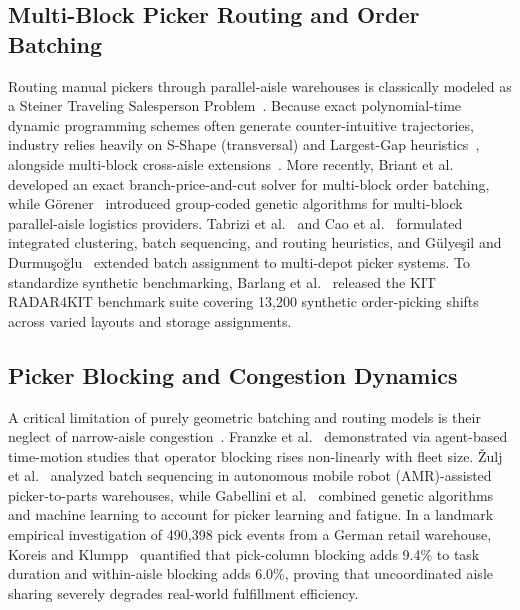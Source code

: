 \documentclass[conference]{IEEEtran}
\begin{document}
\subsection{Multi-Block Picker Routing and Order Batching}
\label{sec:rel_routing}
Routing manual pickers through parallel-aisle warehouses is classically modeled as a Steiner Traveling Salesperson Problem~\cite{hall1993distance,roodbergen2001routing}. Because exact polynomial-time dynamic programming schemes often generate counter-intuitive trajectories, industry relies heavily on S-Shape (transversal) and Largest-Gap heuristics~\cite{hall1993distance}, alongside multi-block cross-aisle extensions~\cite{roodbergen2001routing}. More recently, Briant et al.~\cite{briant2025solving} developed an exact branch-price-and-cut solver for multi-block order batching, while G{\"o}rener~\cite{gorener2025picker} introduced group-coded genetic algorithms for multi-block parallel-aisle logistics providers. Tabrizi et al.~\cite{tabrizi2023three} and Cao et al.~\cite{cao2023solving} formulated integrated clustering, batch sequencing, and routing heuristics, and G{\"u}lye{\c{s}}il and Durmu{\c{s}}o{\u{g}}lu~\cite{gulyesil2024new} extended batch assignment to multi-depot picker systems. To standardize synthetic benchmarking, Barlang et al.~\cite{barlang2026kit} released the KIT RADAR4KIT benchmark suite covering 13,200 synthetic order-picking shifts across varied layouts and storage assignments.

\subsection{Picker Blocking and Congestion Dynamics}
\label{sec:rel_congestion}
A critical limitation of purely geometric batching and routing models is their neglect of narrow-aisle congestion~\cite{franzke2017congestion,gialos2024state}. Franzke et al.~\cite{franzke2017congestion} demonstrated via agent-based time-motion studies that operator blocking rises non-linearly with fleet size. {\v{Z}}ulj et al.~\cite{zulj2022order} analyzed batch sequencing in autonomous mobile robot (AMR)-assisted picker-to-parts warehouses, while Gabellini et al.~\cite{gabellini2024hybrid} combined genetic algorithms and machine learning to account for picker learning and fatigue. In a landmark empirical investigation of 490,398 pick events from a German retail warehouse, Koreis and Klumpp~\cite{koreis2026side} quantified that pick-column blocking adds 9.4\% to task duration and within-aisle blocking adds 6.0\%, proving that uncoordinated aisle sharing severely degrades real-world fulfillment efficiency.
\end{document}
